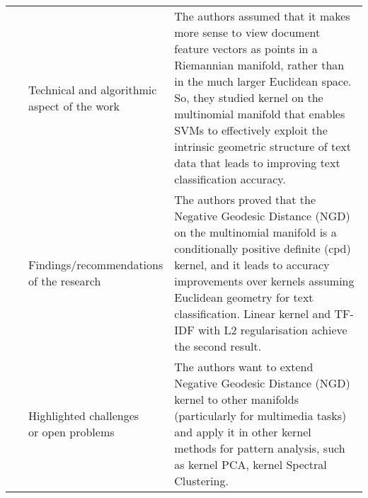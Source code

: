 \begin{landscape}
\begin{longtable}{lp{}p{}}
	\multirow{3}[0]{*}{~\citep{Zhang2005}} & 
    \specialcell{Technical and algorithmic \\ aspect of the work} &
	The authors assumed that it makes more sense to view document feature vectors as points in a Riemannian manifold, rather than in the much larger Euclidean space. So, they studied kernel on the multinomial manifold that enables SVMs to effectively exploit the intrinsic geometric structure of text data that leads to improving text classification accuracy.    
    \\ & 
    \specialcell{Findings/recommendations \\ of the research} & 
	The authors proved that the Negative Geodesic Distance (NGD) on the multinomial manifold is a conditionally positive definite (cpd) kernel, and it leads to accuracy improvements over kernels assuming Euclidean geometry for text classification. Linear kernel and TF-IDF with L2 regularisation achieve the second result.
    \\ & 
    \specialcell{Highlighted challenges \\ or open problems} & 
    The authors want to extend Negative Geodesic Distance (NGD) kernel to other manifolds (particularly for multimedia tasks) and apply it in other kernel methods for pattern analysis, such as kernel PCA, kernel Spectral Clustering.  
	\\
	

\end{longtable}
\end{landscape}
